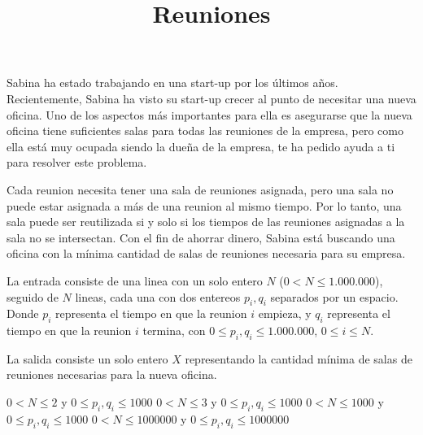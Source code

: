 \documentclass{oci}
\title{Reuniones}
\begin{document}
\begin{problemDescription}
    Sabina ha estado trabajando en una start-up por los últimos años. Recientemente, Sabina ha visto su start-up
    crecer al punto de necesitar una nueva oficina. Uno de los aspectos más importantes para ella es 
    asegurarse que la nueva oficina tiene suficientes salas para todas las reuniones de la empresa, pero como
    ella está muy ocupada siendo la dueña de la empresa, te ha pedido ayuda a ti para resolver este problema.

    Cada reunion necesita tener una sala de reuniones asignada, pero una sala no puede estar asignada a más de 
    una reunion al mismo tiempo. Por lo tanto, una sala puede ser reutilizada si y solo si los tiempos de las
    reuniones asignadas a la sala no se intersectan. Con el fin de ahorrar dinero, Sabina está buscando una 
    oficina con la mínima cantidad de salas de reuniones necesaria para su empresa.
\end{problemDescription}

\begin{inputDescription}
    La entrada consiste de una linea con un solo entero $N$ ($0 < N \leq 1.000.000$), seguido de $N$ lineas,
    cada una con dos entereos $p_i, q_i$ separados por un espacio. Donde $p_i$ representa el tiempo
    en que la reunion $i$ empieza, y $q_i$ representa el tiempo en que la reunion $i$ termina, con 
    $0 \leq p_i, q_i \leq 1.000.000$, $0 \leq i \leq N$.
\end{inputDescription}

\begin{outputDescription}
    La salida consiste un solo entero $X$ representando la cantidad mínima de salas de reuniones necesarias para
    la nueva oficina.
\end{outputDescription}

\begin{scoreDescription}
  $0 < N \leq 2$ y $0 \leq p_i, q_i \leq 1000$
  $0 < N \leq 3$ y $0 \leq p_i, q_i \leq 1000$
  $0 < N \leq 1000$ y $0 \leq p_i, q_i \leq 1000$
  $0 < N \leq 1000000$ y $0 \leq p_i, q_i \leq 1000000$
\end{scoreDescription}

\begin{sampleDescription}
\end{sampleDescription}
\end{document}
